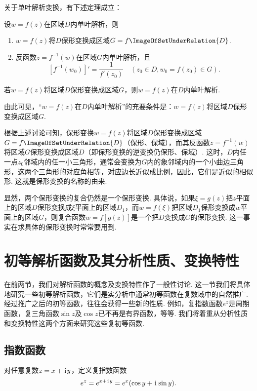 关于单叶解析变换，有下述定理成立：
\begin{theorem}\label{theorem:解析函数.单叶解析变换的性质}
设\(w = f(z)\)在区域\(D\)内单叶解析，则\begin{enumerate}
\item \(w = f(z)\)将\(D\)保形变换成区域\(G = f\ImageOfSetUnderRelation{D}\).
\item 反函数\(z = f^{-1}(w)\)在区域\(G\)内单叶解析，且\[
[ f^{-1}(w_0) ]' = \frac{1}{f'(z_0)}
\quad(z_0 \in D, w_0 = f(z_0) \in G).
\]
\end{enumerate}
\end{theorem}

\begin{theorem}
若\(w = f(z)\)将区域\(D\)保形变换成区域\(G\)，则\(w = f(z)\)在\(D\)内单叶解析.
\end{theorem}
由此可见，“\(w = f(z)\)在\(D\)内单叶解析”的充要条件是：\(w = f(z)\)将区域\(D\)保形变换成区域\(G\).

根据上述讨论可知，保形变换\(w = f(z)\)将区域\(D\)保形变换成区域\(G = f\ImageOfSetUnderRelation{D}\)（保形、保域），而其反函数\(z = f^{-1}(w)\)将区域\(G\)保形变换成区域\(D\)（即保形变换的逆变换仍保形、保域）.
这时，\(D\)内任一点\(z_0\)邻域内的任一小三角形，通常会变换为\(G\)内的象邻域内的一个小曲边三角形，这两个三角形的对应角相等，对应边长近似成比例，因此，它们是近似的相似形.
这就是保形变换的名称的由来.

显然，两个保形变换的复合仍然是一个保形变换.
具体说，如果\(\xi = g(z)\)把\(z\)平面上的区域\(D\)保形变换成\(\xi\)平面上的区域\(D_1\)，而\(w = f(\xi)\)把区域\(D_1\)保形变换成\(w\)平面上的区域\(G\)，则复合函数\(w = f[g(z)]\)是一个把\(D\)变换成\(G\)的保形变换.
这一事实在求具体的保形变换时常常要用到.

\section{初等解析函数及其分析性质、变换特性}
在前两节，我们对解析函数的概念及变换特性作了一般性讨论.
这一节我们将具体地研究一些初等解析函数，它们是实分析中通常初等函数在复数域中的自然推广.
经过推广之后的初等函数，往往会获得一些新的性质.
例如，复指数函数\(e^z\)是周期函数，复三角函数\(\sin z\)及\(\cos z\)已不再是有界函数，等等.
我们将着重从分析性质和变换特性这两个方面来研究这些复初等函数.

\subsection{指数函数}
\begin{definition}\label{definition:解析函数.指数函数}
对任意复数\(z=x+\kern1pt\mathrm{i}\kern1pt y\)，定义复指数函数\begin{equation}
e^z = e^{x+\kern1pt\mathrm{i}\kern1pt y} = e^x(\cos y + \kern1pt\mathrm{i}\kern1pt \sin y).
\end{equation}
\end{definition}


